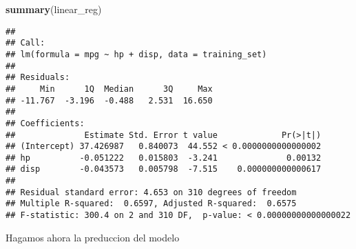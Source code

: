 \documentclass[]{article}
\newenvironment{Shaded}{\begin{snugshade}}{\end{snugshade}}
\newcommand{\DataTypeTok}[1]{\textcolor[rgb]{0.13,0.29,0.53}{#1}}
\newcommand{\KeywordTok}[1]{\textcolor[rgb]{0.13,0.29,0.53}{\textbf{#1}}}
\newcommand{\NormalTok}[1]{#1}
\newcommand{\OperatorTok}[1]{\textcolor[rgb]{0.81,0.36,0.00}{\textbf{#1}}}
\newcommand{\StringTok}[1]{\textcolor[rgb]{0.31,0.60,0.02}{#1}}
\begin{document}
\begin{Shaded}
\begin{Highlighting}[]
\KeywordTok{summary}\NormalTok{(linear_reg)}
\end{Highlighting}
\end{Shaded}

\begin{verbatim}
## 
## Call:
## lm(formula = mpg ~ hp + disp, data = training_set)
## 
## Residuals:
##     Min      1Q  Median      3Q     Max 
## -11.767  -3.196  -0.488   2.531  16.650 
## 
## Coefficients:
##              Estimate Std. Error t value             Pr(>|t|)
## (Intercept) 37.426987   0.840073  44.552 < 0.0000000000000002
## hp          -0.051222   0.015803  -3.241              0.00132
## disp        -0.043573   0.005798  -7.515    0.000000000000617
## 
## Residual standard error: 4.653 on 310 degrees of freedom
## Multiple R-squared:  0.6597, Adjusted R-squared:  0.6575 
## F-statistic: 300.4 on 2 and 310 DF,  p-value: < 0.00000000000000022
\end{verbatim}

Hagamos ahora la preduccion del modelo

\begin{Shaded}
\end{Shaded}
\end{document}

